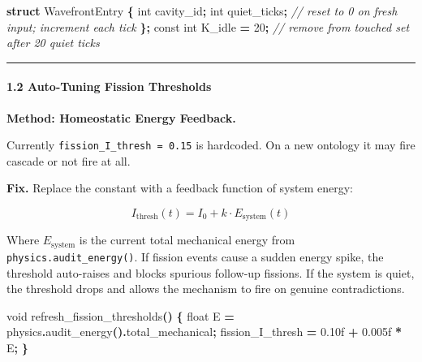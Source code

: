 \documentclass[
  11pt,
  a4paper,
]{article}
\newenvironment{Shaded}{\begin{snugshade}}{\end{snugshade}}
\newcommand{\AttributeTok}[1]{\textcolor[rgb]{0.13,0.29,0.53}{#1}}
\newcommand{\BuiltInTok}[1]{#1}
\newcommand{\CommentTok}[1]{\textcolor[rgb]{0.56,0.35,0.01}{\textit{#1}}}
\newcommand{\DataTypeTok}[1]{\textcolor[rgb]{0.13,0.29,0.53}{#1}}
\newcommand{\DecValTok}[1]{\textcolor[rgb]{0.00,0.00,0.81}{#1}}
\newcommand{\FloatTok}[1]{\textcolor[rgb]{0.00,0.00,0.81}{#1}}
\newcommand{\KeywordTok}[1]{\textcolor[rgb]{0.13,0.29,0.53}{\textbf{#1}}}
\newcommand{\NormalTok}[1]{#1}
\newcommand{\OperatorTok}[1]{\textcolor[rgb]{0.81,0.36,0.00}{\textbf{#1}}}
\begin{document}
\begin{Shaded}
\begin{Highlighting}[]
\KeywordTok{struct}\NormalTok{ WavefrontEntry }\OperatorTok{\{}
    \DataTypeTok{int}\NormalTok{ cavity\_id}\OperatorTok{;}
    \DataTypeTok{int}\NormalTok{ quiet\_ticks}\OperatorTok{;}   \CommentTok{// reset to 0 on fresh input; increment each tick}
\OperatorTok{\};}
\AttributeTok{const} \DataTypeTok{int}\NormalTok{ K\_idle }\OperatorTok{=} \DecValTok{20}\OperatorTok{;}   \CommentTok{// remove from touched set after 20 quiet ticks}
\end{Highlighting}
\end{Shaded}

\begin{center}\rule{0.5\linewidth}{0.5pt}\end{center}

\paragraph{1.2 Auto-Tuning Fission
Thresholds}\label{auto-tuning-fission-thresholds}

\textbf{Method: Homeostatic Energy Feedback.}

Currently \texttt{fission\_I\_thresh\ =\ 0.15} is hardcoded. On a new
ontology it may fire cascade or not fire at all.

\textbf{Fix.} Replace the constant with a feedback function of system
energy:

\[
I_\text{thresh}(t) = I_0 + k \cdot E_\text{system}(t)
\]

Where \(E_\text{system}\) is the current total mechanical energy from
\texttt{physics.audit\_energy()}. If fission events cause a sudden
energy spike, the threshold auto-raises and blocks spurious follow-up
fissions. If the system is quiet, the threshold drops and allows the
mechanism to fire on genuine contradictions.

\begin{Shaded}
\begin{Highlighting}[]
\DataTypeTok{void}\NormalTok{ refresh\_fission\_thresholds}\OperatorTok{()} \OperatorTok{\{}
    \DataTypeTok{float}\NormalTok{ E }\OperatorTok{=}\NormalTok{ physics}\OperatorTok{.}\NormalTok{audit\_energy}\OperatorTok{().}\NormalTok{total\_mechanical}\OperatorTok{;}
\NormalTok{    fission\_I\_thresh }\OperatorTok{=} \FloatTok{0.10}\BuiltInTok{f} \OperatorTok{+} \FloatTok{0.005}\BuiltInTok{f} \OperatorTok{*}\NormalTok{ E}\OperatorTok{;}
\OperatorTok{\}}
\end{Highlighting}
\end{Shaded}
\end{document}

